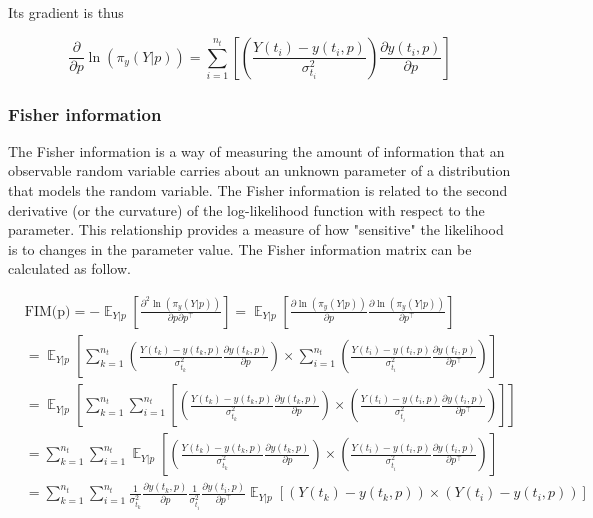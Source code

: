 \documentclass[../Article_Design_of_Experiment.tex]{subfiles}
\begin{document}
	Its gradient is thus
	
	{\footnotesize
	\begin{equation}
		\frac{\partial}{\partial p} \ln (\pi_y (Y|p)) =  \sum_{i=1}^{n_t}  \left[ \left( \frac{Y(t_i) - y(t_i, p)}{\sigma_{t_i}^2} \right) \frac{\partial y(t_i, p)}{\partial p} \right]
	\end{equation} }
	
	\subsubsection{Fisher information}
	
	The Fisher information is a way of measuring the amount of information that an observable random variable carries about an unknown parameter of a distribution that models the random variable. The Fisher information is related to the second derivative (or the curvature) of the log-likelihood function with respect to the parameter. This relationship provides a measure of how "sensitive" the likelihood is to changes in the parameter value. The Fisher information matrix can be calculated as follow.
	
	{\scriptsize
	\begin{equation}
		\begin{aligned}
		&\text{FIM(p)} = - \mathop{\mathbb{E}}_{Y|p} \left[ \frac{\partial^2 \ln (\pi_y (Y|p))}{\partial p \partial p^\top} \right] = \mathop{\mathbb{E}}_{Y|p} \left[ \frac{\partial \ln (\pi_y (Y|p))}{\partial p} \frac{\partial \ln (\pi_y (Y|p))}{\partial p^\top} \right] \nonumber \\
		&= \mathop{\mathbb{E}}_{Y|p} \left[ \sum_{k=1}^{n_t} \left( \frac{Y(t_k) - y(t_k, p)}{\sigma_{t_k}^2} \frac{\partial y(t_k, p)}{\partial p} \right) \times  \sum_{i=1}^{n_t} \left( \frac{Y(t_i) - y(t_i, p)}{\sigma_{t_i}^2} \frac{\partial y(t_i, p)}{\partial p^\top} \right) \right] \nonumber \\
		&= \mathop{\mathbb{E}}_{Y|p} \left[ \sum_{k=1}^{n_t} \sum_{i=1}^{n_t} \left[ \left( \frac{Y(t_k) - y(t_k, p)}{\sigma_{t_k}^2} \frac{\partial y(t_k, p)}{\partial p} \right) \times \left( \frac{Y(t_i) - y(t_i, p)}{\sigma_{t_i}^2} \frac{\partial y(t_i, p)}{\partial p^\top} \right) \right] \right] \nonumber \\
		&= \sum_{k=1}^{n_t} \sum_{i=1}^{n_t} \mathop{\mathbb{E}}_{Y|p} \left[ \left( \frac{Y(t_k) - y(t_k, p)}{\sigma_{t_k}^2} \frac{\partial y(t_k, p)}{\partial p} \right) \times \left( \frac{Y(t_i) - y(t_i, p)}{\sigma_{t_i}^2} \frac{\partial y(t_i, p)}{\partial p^\top} \right) \right] \nonumber \\
		&= \sum_{k=1}^{n_t} \sum_{i=1}^{n_t} \frac{1}{\sigma_{t_k}^2} \frac{\partial y(t_k, p)}{\partial p} \frac{1}{\sigma_{t_i}^2} \frac{\partial y(t_i, p)}{\partial p^\top} \mathop{\mathbb{E}}_{Y|p} \left[ \left( Y(t_k) - y(t_k, p) \right) \times \left( Y(t_i) - y(t_i, p) \right) \right] 
	\end{aligned} 
	\end{equation} }
	
\end{document}
